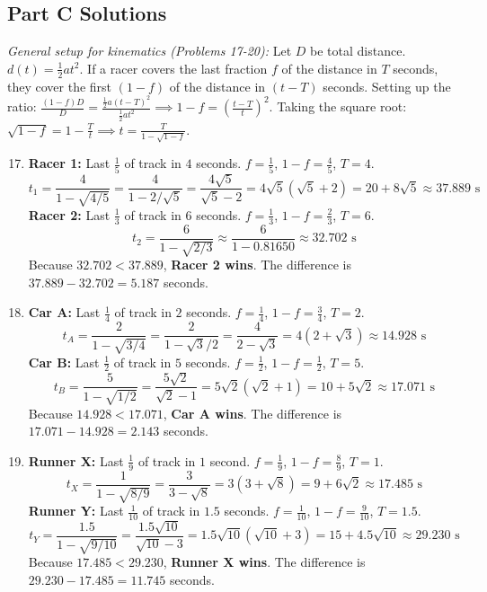 \documentclass{article}
\begin{document}
\subsection*{Part C Solutions}
\textit{General setup for kinematics (Problems 17-20):} Let $D$ be total distance. $d(t) = \frac{1}{2}at^2$. If a racer covers the last fraction $f$ of the distance in $T$ seconds, they cover the first $(1-f)$ of the distance in $(t - T)$ seconds. 
Setting up the ratio: $\frac{(1-f)D}{D} = \frac{\frac{1}{2}a(t-T)^2}{\frac{1}{2}at^2} \implies 1-f = \left(\frac{t-T}{t}\right)^2$. 
Taking the square root: $\sqrt{1-f} = 1 - \frac{T}{t} \implies t = \frac{T}{1 - \sqrt{1-f}}$.

\begin{enumerate}
    \setcounter{enumi}{16}
    \item \textbf{Racer 1:} Last $\frac{1}{5}$ of track in $4$ seconds. $f = \frac{1}{5}$, $1-f = \frac{4}{5}$, $T=4$.
    $$ t_1 = \frac{4}{1 - \sqrt{4/5}} = \frac{4}{1 - 2/\sqrt{5}} = \frac{4\sqrt{5}}{\sqrt{5} - 2} = 4\sqrt{5}(\sqrt{5}+2) = 20 + 8\sqrt{5} \approx 37.889 \text{ s} $$
    \textbf{Racer 2:} Last $\frac{1}{3}$ of track in $6$ seconds. $f = \frac{1}{3}$, $1-f = \frac{2}{3}$, $T=6$.
    $$ t_2 = \frac{6}{1 - \sqrt{2/3}} \approx \frac{6}{1 - 0.81650} \approx 32.702 \text{ s} $$
    Because $32.702 < 37.889$, \textbf{Racer 2 wins}. The difference is $37.889 - 32.702 = 5.187$ seconds.
    
    \item \textbf{Car A:} Last $\frac{1}{4}$ of track in $2$ seconds. $f = \frac{1}{4}$, $1-f = \frac{3}{4}$, $T=2$.
    $$ t_A = \frac{2}{1 - \sqrt{3/4}} = \frac{2}{1 - \sqrt{3}/2} = \frac{4}{2 - \sqrt{3}} = 4(2+\sqrt{3}) \approx 14.928 \text{ s} $$
    \textbf{Car B:} Last $\frac{1}{2}$ of track in $5$ seconds. $f = \frac{1}{2}$, $1-f = \frac{1}{2}$, $T=5$.
    $$ t_B = \frac{5}{1 - \sqrt{1/2}} = \frac{5\sqrt{2}}{\sqrt{2} - 1} = 5\sqrt{2}(\sqrt{2}+1) = 10 + 5\sqrt{2} \approx 17.071 \text{ s} $$
    Because $14.928 < 17.071$, \textbf{Car A wins}. The difference is $17.071 - 14.928 = 2.143$ seconds.
    
    \item \textbf{Runner X:} Last $\frac{1}{9}$ of track in $1$ second. $f = \frac{1}{9}$, $1-f = \frac{8}{9}$, $T=1$.
    $$ t_X = \frac{1}{1 - \sqrt{8/9}} = \frac{3}{3 - \sqrt{8}} = 3(3+\sqrt{8}) = 9 + 6\sqrt{2} \approx 17.485 \text{ s} $$
    \textbf{Runner Y:} Last $\frac{1}{10}$ of track in $1.5$ seconds. $f = \frac{1}{10}$, $1-f = \frac{9}{10}$, $T=1.5$.
    $$ t_Y = \frac{1.5}{1 - \sqrt{9/10}} = \frac{1.5\sqrt{10}}{\sqrt{10} - 3} = 1.5\sqrt{10}(\sqrt{10}+3) = 15 + 4.5\sqrt{10} \approx 29.230 \text{ s} $$
    Because $17.485 < 29.230$, \textbf{Runner X wins}. The difference is $29.230 - 17.485 = 11.745$ seconds.
    

\end{enumerate}
\end{document}
